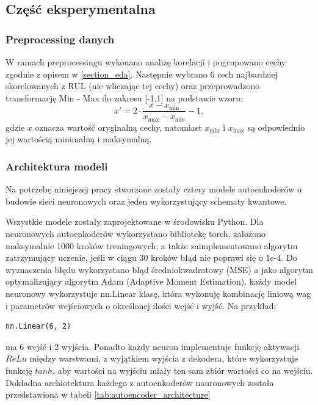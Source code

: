 \subsection{Część eksperymentalna}

\subsubsection{Preprocessing danych}
W ramach preprocessingu wykonano analizę korelacji i pogrupowano cechy zgodnie z opisem w \ref{section_eda}. Następnie wybrano 6 cech najbardziej skorelowanych z RUL (nie wliczając tej cechy) oraz przeprowadzono transformację Min - Max do zakresu [-1,1] na podstawie wzoru:
\[
x' = 2 \cdot \frac{x - x_{\min}}{x_{\max} - x_{\min}} - 1,
\]
gdzie $x$ oznacza wartość oryginalną cechy, natomiast $x_{\min}$ i $x_{\max}$ są odpowiednio jej wartością minimalną i maksymalną.

\subsubsection{Architektura modeli}
Na potrzebę niniejszej pracy stworzone zostały cztery modele autoenkoderów o budowie sieci neuronowych oraz jeden wykorzystujący schematy kwantowe.

Wszystkie modele zostały zaprojektowane w środowisku Python.
Dla neuronowych autoenkoderów wykorzystano bibliotekę torch, założono maksymalnie 1000 kroków treningowych, a także zaimplementowano algorytm zatrzymujący uczenie, jeśli w ciągu 30 kroków błąd nie poprawi się o 1e-4. Do wyznaczenia błędu wykorzystano błąd średniokwadratowy (MSE) a jako algorytm optymalizujący algorytm Adam (Adaptive Moment Estimation). 
każdy model neuronowy wykorzystuje nn.Linear klasę, która wykonuję kombinację liniową wag i parametrów wejściowych o określonej ilości wejść i wyjść. Na przykład:
\begin{verbatim}
nn.Linear(6, 2)    
\end{verbatim}
ma 6 wejść i 2 wyjścia.
Ponadto każdy neuron implementuje funkcję aktywacji $ReLu$ między warstwami, z wyjątkiem wyjścia z dekodera, które wykorzystuje funkcję $tanh$, aby wartości na wyjściu miały ten sam zbiór wartości co na wejściu. Dokładna archiotektura każdego z autoenkoderów nauronowych została przedstawiona w tabeli \ref{tab:autoencoder_architecture}\\

